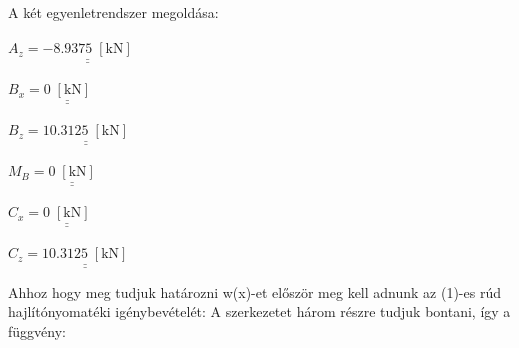 \documentclass[10pt, a4paper]{article}
\newcommand{\ketto}{\begin{trivlist}\item[\hskip \labelsep {\bfseries 
			{2. Feladat:}}]\end{trivlist}}
\newcommand{\kn}{\;\mathrm{\left[kN\right]}}
\begin{document}
	A két egyenletrendszer megoldása:\\\\
	\tabto{50pt}$A_z = \underline{\underline{-8.9375 \kn}}$\\\\
	\tabto{50pt}$B_x = \underline{\underline{0 \kn}}$\\\\
	\tabto{50pt}$B_z = \underline{\underline{10.3125 \kn}}$\\\\
	\tabto{50pt}$M_B = \underline{\underline{0 \kn}}$\\\\
	\tabto{50pt}$C_x = \underline{\underline{0 \kn}}$\\\\
	\tabto{50pt}$C_z = \underline{\underline{10.3125 \kn}}$
	\newpage
	\ketto
	Ahhoz hogy meg tudjuk határozni w(x)-et először meg kell adnunk az (1)-es rúd hajlítónyomatéki igénybevételét:
	A szerkezetet három részre tudjuk bontani, így a függvény:
\end{document}
